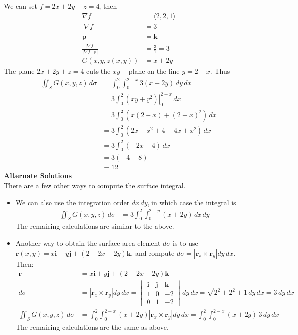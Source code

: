     \ifnum {} {\color{DarkBlue} 
    We can set $f = 2x+2y+z=4$, then
    \begin{align*}
        \nabla f & = \langle2,2,1\rangle \\
        |\nabla f | &= 3 \\
        \mathbf p &= \mathbf k \\
        \frac{|\nabla f|}{|\nabla f \cdot \mathbf p|} & = \frac{3}{1} = 3 \\
        G(x,y,z(x,y)) &= x + 2y  
    \end{align*}
    The plane $2x + 2y + z = 4$ cuts the $xy-$plane on the line $y = 2 - x$. Thus
    \begin{align}
        \iint_S G(x,y,z) \, d\sigma 
        &= \int_0^2 \int_0^{2-x} 3 (x+2y) \, dy\, dx \\
        & = 3 \int_0^2 \left. (xy+y^2) \right|_0^{2-x} \, dx \\
        & = 3 \int_0^2  (x(2-x)+(2-x)^2) \, dx \\
        &= 3 \int_0^2 (2x-x^2 +4-4x + x^2 ) \, dx \\
        &= 3 \int_0^2 (-2x +4  ) \, dx \\
        &= 3 (-4  + 8 ) \\
        &= 12
    \end{align}
    \textbf{Alternate Solutions}\\
    There are a few other ways to compute the surface integral. 
    \begin{itemize}
    \item We can also use the integration order $dx\,dy$, in which case the integral is
    \begin{align}
        \iint_S G(x,y,z) \, d\sigma 
        &= 3 \int_0^2 \int_0^{2-y}  (x+2y) \, dx\, dy 
    \end{align}    
    The remaining calculations are similar to the above. 
    
    \item Another way to obtain the surface area element $d\sigma$ is to use $\mathbf r(x,y) = x\mathbf i + y \mathbf j + (2-2x-2y)\mathbf k$, and compute $d\sigma = |\mathbf r_x \times \mathbf r_y| dy\,dx$. Then:
    \begin{align}
        \mathbf r &= x\mathbf i + y \mathbf j + (2-2x-2y)\mathbf k \\
        d\sigma &= |\mathbf r_x \times \mathbf r_y| dy\,dx 
        = \begin{vmatrix} \mathbf i & \mathbf j & \mathbf k \\ 1 & 0 & -2\\0&1&-2 \end{vmatrix} dy\,dx = \sqrt{2^2 + 2^2 + 1} \, dy\,dx = 3 \, dy\,dx \\
        \iint_S G(x,y,z) \, d\sigma 
        &= \int_0^2 \int_0^{2-x} (x+2y)  |\mathbf r_x \times \mathbf r_y| dy\,dx  = \int_0^2 \int_0^{2-x} (x+2y)\, 3 \, dy\, dx 
    \end{align}
    The remaining calculations are the same as above. 



\end{itemize}}
